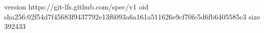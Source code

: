 version https://git-lfs.github.com/spec/v1
oid sha256:02f54d7f45683f9437792e13f6093a6a161a511626e9cf70fe5d6fb6405585c3
size 392433
